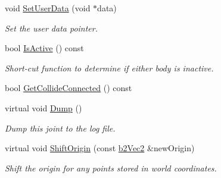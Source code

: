 \begin{DoxyCompactItemize}
\mbox{\label{classb2_joint_a492f2d02496437572aaec6013ebdc1c8}} 
void \hyperlink{classb2_joint_a492f2d02496437572aaec6013ebdc1c8}{Set\+User\+Data} (void $\ast$data)
\begin{DoxyCompactList}\small\item\em Set the user data pointer. \end{DoxyCompactList}\item 
\mbox{\label{classb2_joint_ae9cfbd158216c9855c2f018ff3c9c922}} 
bool \hyperlink{classb2_joint_ae9cfbd158216c9855c2f018ff3c9c922}{Is\+Active} () const
\begin{DoxyCompactList}\small\item\em Short-\/cut function to determine if either body is inactive. \end{DoxyCompactList}\item 
bool \hyperlink{classb2_joint_a48492903df96c8a7b8cad8ed826f8cb0}{Get\+Collide\+Connected} () const
\item 
\mbox{\label{classb2_joint_abd35e7316017ad9a40d5dbf9b5ba3f36}} 
virtual void \hyperlink{classb2_joint_abd35e7316017ad9a40d5dbf9b5ba3f36}{Dump} ()
\begin{DoxyCompactList}\small\item\em Dump this joint to the log file. \end{DoxyCompactList}\item 
\mbox{\label{classb2_joint_a7804f649e993dc0fd9ae47fde5601f90}} 
virtual void \hyperlink{classb2_joint_a7804f649e993dc0fd9ae47fde5601f90}{Shift\+Origin} (const \hyperlink{structb2_vec2}{b2\+Vec2} \&new\+Origin)
\begin{DoxyCompactList}\small\item\em Shift the origin for any points stored in world coordinates. \end{DoxyCompactList}\end{DoxyCompactItemize}
